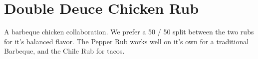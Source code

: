 \section[Double Deuce]{Double Deuce Chicken Rub}\label{double_deuce_rub}


\begin{recipestats}[
	servings=1~\pound,
	preptime=10~\minute,
	original=Kevin \& Mike,
]
\end{recipestats}


\begin{recipeabstract}
	A barbeque chicken collaboration.
	We prefer a 50 / 50 split between the two rubs for it's balanced flavor.
	The Pepper Rub works well on it's own for a traditional Barbeque, and the Chile Rub for tacos.
\end{recipeabstract}


\begin{ingredientcolumns}
	\begin{ingredientblock}
		\\
		\\
		\\
		\\
		\\
	\end{ingredientblock}
	\vfill\null
	\columnbreak

	\begin{ingredientblock}
		\\
		\\
		\\
		\\
		\\
		\\
		\\
	\end{ingredientblock}
\end{ingredientcolumns}


